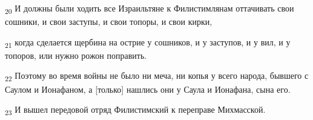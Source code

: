 \begin{tcolorbox}
\textsubscript{20} И должны были ходить все Израильтяне к Филистимлянам оттачивать свои сошники, и свои заступы, и свои топоры, и свои кирки,
\end{tcolorbox}
\begin{tcolorbox}
\textsubscript{21} когда сделается щербина на острие у сошников, и у заступов, и у вил, и у топоров, или нужно рожон поправить.
\end{tcolorbox}
\begin{tcolorbox}
\textsubscript{22} Поэтому во время войны не было ни меча, ни копья у всего народа, бывшего с Саулом и Ионафаном, а [только] нашлись они у Саула и Ионафана, сына его.
\end{tcolorbox}
\begin{tcolorbox}
\textsubscript{23} И вышел передовой отряд Филистимский к переправе Михмасской.
\end{tcolorbox}
